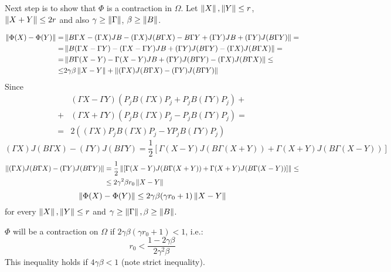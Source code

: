 \documentclass{article}
\begin{document}
Next step is to show that \( \Phi \) is a contraction in \( \Omega \).
Let \( \left\|{X}\right\|, \left\|{Y}\right\| \leq r \), \( \left\|{X+Y}\right\| \leq 2r \) and also \( \gamma\geq\left\|{\Gamma}\right\| \), \( \beta\geq\left\|{B}\right\| \).

\begin{align*}
    \left\|{\Phi(X) - \Phi(Y)}\right\|
    =& \left\|{B\Gamma X - (\Gamma X)JB - (\Gamma X)J(B\Gamma X) - B\Gamma Y + (\Gamma Y)JB + (\Gamma Y)J(B\Gamma Y)}\right\| = \\
    =& \left\|{B(\Gamma X - \Gamma Y) - (\Gamma X - \Gamma Y) JB + (\Gamma Y) J(B\Gamma Y) - (\Gamma X)J(B\Gamma X)}\right\| = \\
    =& \left\|{B\Gamma(X-Y) - \Gamma(X-Y)JB + (\Gamma Y) J(B\Gamma Y) - (\Gamma X)J(B\Gamma X)}\right\| \leq \\
    \leq& 2\gamma\beta\left\|{X-Y}\right\| + \left\|{(\Gamma X)J(B\Gamma X) - (\Gamma Y) J(B\Gamma Y)}\right\|
\end{align*}
Since 
\begin{align*}
    &(\Gamma X - \Gamma Y)(P_jB(\Gamma X)P_j + P_jB(\Gamma Y)P_j) + \\
    + &(\Gamma X + \Gamma Y)(P_jB(\Gamma X)P_j - P_jB(\Gamma Y)P_j) = \\
= &2((\Gamma X)P_jB(\Gamma X)P_j- YP_jB(\Gamma Y)P_j)\end{align*}
\[(\Gamma X)J(B\Gamma X) - (\Gamma Y) J(B\Gamma Y)
= \frac12\left[\Gamma(X-Y)J(B\Gamma(X+Y)) + \Gamma(X+Y)J(B\Gamma(X-Y))\right]\]
\begin{align*}
    \left\|{(\Gamma X)J(B\Gamma X) - (\Gamma Y) J(B\Gamma Y)}\right\|
    &= \frac12\left\|{\left[\Gamma(X-Y)J(B\Gamma(X+Y)) + \Gamma(X+Y)J(B\Gamma(X-Y))\right]}\right\|\leq \\
    &\leq 2\gamma^2\beta r_0 \left\|{X-Y}\right\|
\end{align*}
\[\left\|{\Phi(X) - \Phi(Y)}\right\| \leq 2\gamma\beta(\gamma r_0 + 1)\left\|{X-Y}\right\|\]
for every \( \left\|{X}\right\|, \left\|{Y}\right\| \leq r \) and \( \gamma\geq\left\|{\Gamma}\right\|, \beta\geq\left\|{B}\right\| \).

\( \Phi \) will be a contraction on \( \Omega \) if \( 2\gamma\beta(\gamma r_0 + 1) < 1 \), i.e.:
\[r_0 < \frac{1-2\gamma\beta}{2\gamma^2\beta}\]
This inequality holds if \( 4\gamma\beta < 1 \) (note strict inequality).
\end{document}

